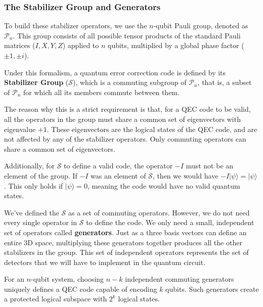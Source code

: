 \subsubsection{The Stabilizer Group and Generators}
To build these stabilizer operators, we use the $n$-qubit Pauli group, denoted as $\mathcal{P}_n$. This group consists of all possible tensor products of the standard Pauli matrices ($I, X, Y, Z$) applied to $n$ qubits, multiplied by a global phase factor ($\pm 1, \pm i$). 

Under this formalism, a quantum error correction code is defined by its \textbf{Stabilizer Group} ($\mathcal{S}$), which is a commuting subgroup of $\mathcal{P}_n$, that is, a subset of $\mathcal{P}_n$ for which all its members commute between them. 

The reason why this is a strict requirement is that, for a QEC code to be valid, all the operators in the group must share a common set of eigenvectors with eigenvalue $+1$. These eigenvectors are the logical states of the QEC code, and are not affected by any of the stabilizer operators. Only commuting operators can share a common set of eigenvectors.

Additionally, for $\mathcal{S}$ to define a valid code, the operator $-I$ must not be an element of the group. If $-I$ was an element of $\mathcal{S}$, then we would have $-I \lvert \psi \rangle = \lvert \psi \rangle$. This only holds if $\lvert \psi \rangle = 0$, meaning the code would have no valid quantum states.

We've defined the $\mathcal{S}$ as a set of commuting operators. However, we do not need every single operator in $\mathcal{S}$ to define the code. We only need a small, independent set of operators called \textbf{generators}. Just as a three basis vectors can define an entire 3D space, multiplying these generators together produces all the other stabilizers in the group. This set of independent operators represents the set of detectors that we will have to implement in the quantum circuit.

For an $n$-qubit system, choosing $n-k$ independent commuting generators uniquely defines a QEC code capable of encoding $k$ qubits. Such generators create a protected logical subspace with $2^k$ logical states.

